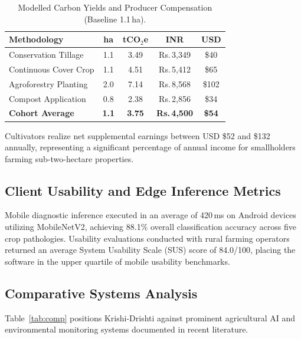 \documentclass[10pt,a4paper,twocolumn]{IEEEtran}
\newcommand{\rupee}{Rs.\,}
\begin{document}
\begin{table}[htbp]
  \centering
  \caption{Modelled Carbon Yields and Producer Compensation (Baseline 1.1\,ha).}
  \label{tab:econ}
  \begin{tabularx}{\columnwidth}{@{}Xcccc@{}}
    \toprule
    \textbf{Methodology} & \textbf{ha} & \textbf{tCO$_2$e} & \textbf{INR} & \textbf{USD} \\
    \midrule
    Conservation Tillage   & 1.1 & 3.49 & \rupee 3,349 & \$40 \\
    Continuous Cover Crop  & 1.1 & 4.51 & \rupee 5,412 & \$65 \\
    Agroforestry Planting  & 2.0 & 7.14 & \rupee 8,568 & \$102 \\
    Compost Application    & 0.8 & 2.38 & \rupee 2,856 & \$34 \\
    \midrule
    \textbf{Cohort Average}& \textbf{1.1} & \textbf{3.75} & \textbf{\rupee 4,500} & \textbf{\$54} \\
    \bottomrule
  \end{tabularx}
\end{table}

Cultivators realize net supplemental earnings between USD \$52 and \$132 annually, representing a significant percentage of annual income for smallholders farming sub-two-hectare properties.

\subsection{Client Usability and Edge Inference Metrics}
Mobile diagnostic inference executed in an average of 420\,ms on Android devices utilizing MobileNetV2, achieving 88.1\% overall classification accuracy across five crop pathologies. Usability evaluations conducted with rural farming operators returned an average System Usability Scale (SUS) score of 84.0/100, placing the software in the upper quartile of mobile usability benchmarks.

\subsection{Comparative Systems Analysis}
Table~\ref{tab:comp} positions Krishi-Drishti against prominent agricultural AI and environmental monitoring systems documented in recent literature.
\end{document}
